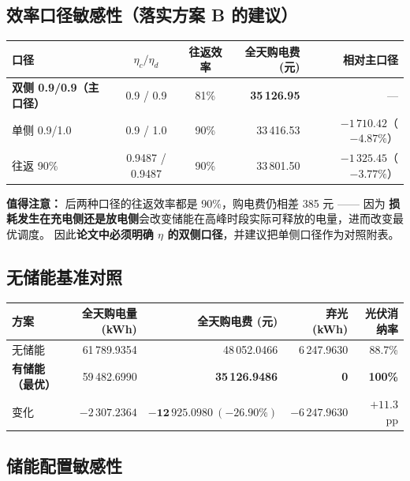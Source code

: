 \documentclass[12pt,a4paper]{ctexart}
\begin{document}
\subsection{效率口径敏感性（落实方案 B 的建议）}

\begin{center}
\begin{tabular}{@{}l c c r r@{}}
\toprule
口径 & $\eta_c/\eta_d$ & 往返效率 & 全天购电费 (元) & 相对主口径 \\
\midrule
\textbf{双侧 0.9/0.9（主口径）} & 0.9 / 0.9 & 81\% & \textbf{35\,126.95} & --- \\
单侧 0.9/1.0 & 0.9 / 1.0 & 90\% & 33\,416.53 & $-1\,710.42$（$-4.87\%$）\\
往返 90\% & 0.9487 / 0.9487 & 90\% & 33\,801.50 & $-1\,325.45$（$-3.77\%$）\\
\bottomrule
\end{tabular}
\end{center}

\textbf{值得注意：} 后两种口径的往返效率都是 90\%，购电费仍相差 385 元 —— 因为
\textbf{损耗发生在充电侧还是放电侧}会改变储能在高峰时段实际可释放的电量，进而改变最优调度。
因此\textbf{论文中必须明确 $\eta$ 的双侧口径}，并建议把单侧口径作为对照附表。

\subsection{无储能基准对照}

\begin{center}
\begin{tabular}{@{}l r r r r@{}}
\toprule
方案 & 全天购电量 (kWh) & 全天购电费 (元) & 弃光 (kWh) & 光伏消纳率 \\
\midrule
无储能 & 61\,789.9354 & 48\,052.0466 & 6\,247.9630 & 88.7\% \\
\textbf{有储能（最优）} & 59\,482.6990 & \textbf{35\,126.9486} & \textbf{0} & \textbf{100\%} \\
变化 & $-2\,307.2364$ & $\mathbf{-12\,925.0980\ (-26.90\%)}$ & $-6\,247.9630$ & $+11.3$ pp \\
\bottomrule
\end{tabular}
\end{center}

\subsection{储能配置敏感性}
\end{document}
